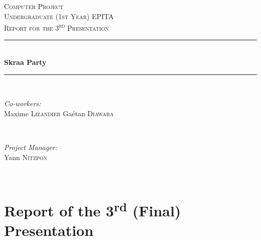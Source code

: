 \documentclass[12pt]{article}
\newcommand{\ts}{\textsuperscript}
\newcommand{\HRule}{\rule{\linewidth}{0.5mm}} %
\begin{document}
\begin{center}


 

\textsc{\LARGE Computer Project}\\[1.5cm] %
\textsc{\Large Undergraduate (1st Year) EPITA}\\[0.5cm] %
\textsc{\large Report for the 3\ts{rd} Presentation}\\[0.5cm] %



\HRule \\[0.4cm]
{ \huge \bfseries Skraa Party}\\[0.4cm] %
\HRule \\[1.5cm]
 

\begin{minipage}{0.4\textwidth}
\begin{flushleft} \large
\emph{Co-workers:}\\
Maxime \textsc{Lizandier} %
Ga\'etan \textsc{Diawara}
\end{flushleft}
\end{minipage}
~
\begin{minipage}{0.4\textwidth}
\begin{flushright} \large
\emph{Project Manager:} \\
Yann \textsc{Nitzpon} %
\end{flushright}
\end{minipage}\\[2cm]

\end{center}

\newpage

\section{Report of the 3\ts{rd} (Final) Presentation}
\end{document}
